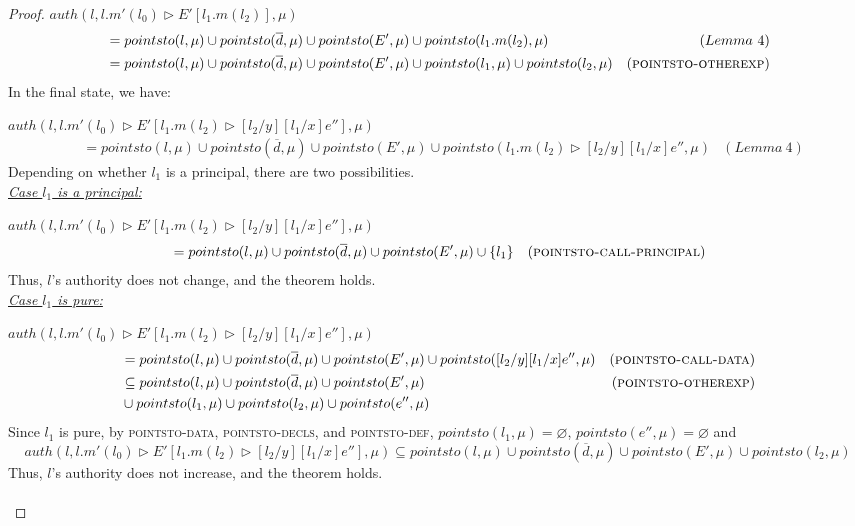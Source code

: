 \documentclass{llncs}
\begin{document}
\begin{proof}
\noindent$auth(l, l.m'(l_0) \rhd E'[l_1.m(l_2)], \mu)$
\vspace{-7pt}
\begin{align*}
&= pointsto(l, \mu) \cup pointsto(\overline{d}, \mu) \cup pointsto(E', \mu) \cup pointsto(l_1.m(l_2), \mu) & (Lemma~4)\\
&= pointsto(l, \mu) \cup pointsto(\overline{d}, \mu) \cup pointsto(E', \mu) \cup pointsto(l_1, \mu) \cup pointsto(l_2, \mu) & (\textsc{pointsto-otherexp})
\end{align*}
In the final state, we have:

\noindent$auth(l, l.m'(l_0) \rhd E'[l_1.m(l_2) \rhd [l_2/y] [l_1/x] e''], \mu)$
\vspace{-7pt}
\begin{align*}
&= pointsto(l, \mu) \cup pointsto(\overline{d}, \mu) \cup pointsto(E', \mu) \cup pointsto(l_1.m(l_2) \rhd [l_2/y] [l_1/x] e'', \mu) & (Lemma~4)
\end{align*}
Depending on whether $l_1$ is a principal, there are two possibilities.\\

\noindent\textit{\underline{Case $l_1$ is a principal:}}

\noindent$auth(l, l.m'(l_0) \rhd E'[l_1.m(l_2) \rhd [l_2/y] [l_1/x] e''], \mu)$
\vspace{-7pt}
\begin{align*}
&= pointsto(l, \mu) \cup pointsto(\overline{d}, \mu) \cup pointsto(E', \mu) \cup \{ l_1 \} & (\textsc{pointsto-call-principal})
\end{align*}
Thus, $l$'s authority does not change, and the theorem holds.\\

\noindent\textit{\underline{Case $l_1$ is pure:}} 

\noindent$auth(l, l.m'(l_0) \rhd E'[l_1.m(l_2) \rhd [l_2/y] [l_1/x] e''], \mu)$
\vspace{-7pt}
\begin{align*}
&= pointsto(l, \mu) \cup pointsto(\overline{d}, \mu) \cup pointsto(E', \mu) \cup pointsto([l_2/y] [l_1/x] e'', \mu) & (\textsc{pointsto-call-data})\\
&\subseteq pointsto(l, \mu) \cup pointsto(\overline{d}, \mu) \cup pointsto(E', \mu) & (\textsc{pointsto-otherexp}) \\
&\cup pointsto(l_1, \mu) \cup pointsto(l_2, \mu) \cup pointsto(e'', \mu)
\end{align*}
Since $l_1$ is pure, by \textsc{pointsto-data}, \textsc{pointsto-decls}, and \textsc{pointsto-def}, \mbox{$pointsto(l_1, \mu) = \varnothing$}, $pointsto(e'', \mu) = \varnothing$ and
\[
auth(l, l.m'(l_0) \rhd E'[l_1.m(l_2) \rhd [l_2/y] [l_1/x] e''], \mu) \subseteq pointsto(l, \mu) \cup pointsto(\overline{d}, \mu) \cup pointsto(E', \mu) \cup pointsto(l_2, \mu)
\]
Thus, $l$'s authority does not increase, and the theorem holds.\\\\



\end{proof}
\end{document}
